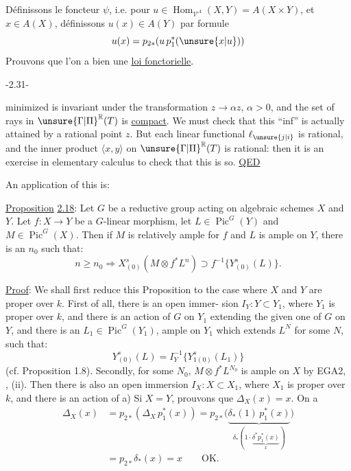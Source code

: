 
Définissons le foncteur $\psi$,  i.e. pour
$u\in\operatorname{Hom}_{\mathcal V^A}(X,Y)=A(X\times Y)$, et $x\in A(X)$, définissons $u(x)\in A(Y)$
par formule 
\[
u(x)=p_{2*}(u\,p_1^*(\unsure{x|u}))
\]
Prouvons que l'on a bien une \uline{loi fonctorielle}.
\begin{center}-2.31-\end{center}
minimized is invariant under the transformation $z\longrightarrow\alpha z$, $\alpha>0$,
and the set of rays in $\unsure{\Gamma|\Pi}^{\mathbb R}(T)$ is \uline{compact}. We must check that this
``inf'' is actually attained by a rational point $z$. But each linear
functional $\ell_{\unsure{j|i}}$ is rational, and the inner product $\langle x,y\rangle$ on $\unsure{\Gamma|\Pi}^{\mathbb R}(T)$
is rational: then it is an exercise in elementary calculus to check
that this is so. \uline{QED}

An application of this is:

\uline{Proposition} \uline{2.18}: Let $G$ be a reductive group acting on algebraic
schemes $X$ and $Y$. Let $f:X\longrightarrow Y$ be a $G$-linear morphism, let
$L\in\operatorname{Pic}^G(Y)$ and $M\in\operatorname{Pic}^G(X)$. Then if $M$ is relatively ample for $f$
and $L$ is ample on $Y$, there is an $n_0$ such that:
\[
n\geq n_0\Longrightarrow X^s_{(0)}(M\otimes f^*L^n)\supset f^{-1}\{Y^s_{(0)}(L)\}.
\]

\uline{Proof}: We shall first reduce this Proposition to the case where
$X$ and $Y$ are proper over $k$. First of all, there is an open immer-
sion $I_Y:Y\subset Y_1$, where $Y_1$ is proper over $k$, and there is an
action of $G$ on $Y_1$ extending the given one of $G$ on $Y$, and there
is an $L_1\in\operatorname{Pic}^G(Y_1)$, ample on $Y_1$ which extends $L^N$ for some $N$,
such that:
\[
Y^s_{(0)}(L)=I_Y^{-1}\{Y^s_{1(0)}(L_1)\}
\]
(cf. Proposition 1.8). Secondly, for some $N_0$, $M\otimes f^*L^{N_0}$ is ample
on $X$ by EGA2, , (ii). Then there is also an open immersion
$I_X:X\subset X_1$, where $X_1$ is proper over $k$, and there is an action of
a) Si $X=Y$, prouvons que $\Delta_X(x)=x$. On a
\[
\begin{aligned}
\Delta_X(x)&=p_{2*}(\Delta_X\,p_1^*(x))
=p_{2*}\bigl(\underbrace{\delta_*(1)\,p_1^*(x)}_{\delta_*(1\cdot\underbrace{\delta^*p_1^*(x)}_x)}\bigr)\\
&=p_{2*}\delta_*(x)=x\qquad\mathrm{OK}.
\end{aligned}
\]


